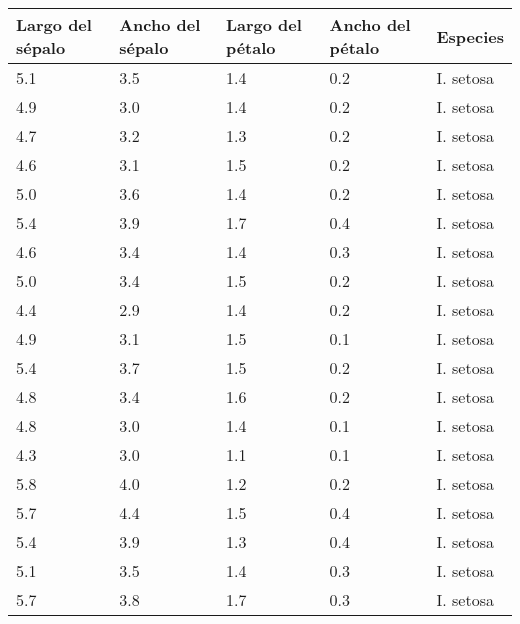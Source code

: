 \begin{appendices}
\begin{center}
\begin{tabular}{|p{2cm}|p{2cm}|p{2cm}|p{2cm}|p{2cm}|}
\hline
Largo del sépalo & Ancho del sépalo & Largo del pétalo & Ancho del pétalo & Especies \\
\hline
5.1 & 3.5 & 1.4 & 0.2 & I. setosa\\
\hline
4.9	& 3.0 & 1.4 & 0.2 & I. setosa\\
\hline
4.7	& 3.2 & 1.3 & 0.2 & I. setosa\\
\hline
4.6	& 3.1 & 1.5 & 0.2 & I. setosa\\
\hline
5.0	& 3.6 & 1.4 & 0.2 & I. setosa\\
\hline
5.4	& 3.9 & 1.7	& 0.4 & I. setosa\\
\hline
4.6	& 3.4 & 1.4	& 0.3 & I. setosa\\
\hline
5.0	& 3.4 & 1.5	& 0.2 & I. setosa\\
\hline
4.4	& 2.9 & 1.4	& 0.2 & I. setosa\\
\hline
4.9	& 3.1 & 1.5	& 0.1 & I. setosa\\
\hline
5.4	& 3.7 & 1.5	& 0.2 & I. setosa\\
\hline
4.8	& 3.4 & 1.6	& 0.2 & I. setosa\\
\hline
4.8	& 3.0 & 1.4	& 0.1 & I. setosa\\
\hline
4.3	& 3.0 & 1.1	& 0.1 & I. setosa\\
\hline
5.8	& 4.0 & 1.2	& 0.2 & I. setosa\\
\hline
5.7	& 4.4 & 1.5	& 0.4 & I. setosa\\
\hline
5.4	& 3.9 & 1.3	& 0.4 & I. setosa\\
\hline
5.1	& 3.5 & 1.4	& 0.3 & I. setosa\\
\hline
5.7	& 3.8 & 1.7	& 0.3 & I. setosa\\
\hline
\end{tabular}
\end{center}


\end{appendices}
